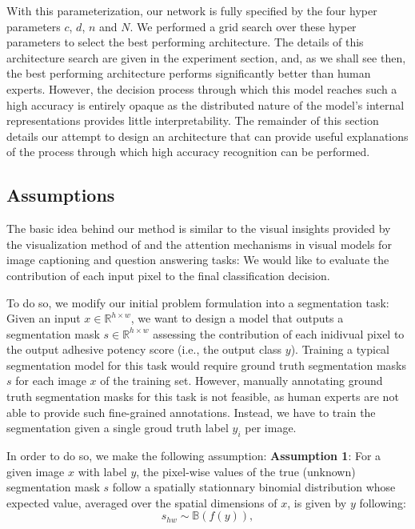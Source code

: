 \documentclass[10pt,twocolumn,letterpaper]{article}
\begin{document}
With this parameterization, our network is fully specified by the four hyper parameters $c$, $d$, $n$ and $N$.
We performed a grid search over these hyper parameters to select the best performing architecture.
The details of this architecture search are given in the experiment section,
and, as we shall see then, the best performing architecture performs significantly better than human experts.
However, the decision process through which this model reaches such a high accuracy is entirely opaque
as the distributed nature of the model's internal representations provides little interpretability.
The remainder of this section details our attempt to design an architecture that can provide 
useful explanations of the process through which high accuracy recognition can be performed.

\subsection{Assumptions}
The basic idea behind our method is similar to the visual insights provided by the
visualization method of \cite{} and the attention mechanisms in visual models 
for image captioning and question answering tasks:
We would like to evaluate the contribution of each input pixel to the final classification decision. 

To do so, we modify our initial problem formulation into a segmentation task:
Given an input $x \in \mathbb{R}^{h \times w}$, we want to design a model that outputs 
a segmentation mask $s \in \mathbb{R}^{h \times w}$ assessing the contribution of each inidivual pixel to the output adhesive potency score (i.e., the output class $y$).
Training a typical segmentation model for this task would require ground truth 
segmentation masks $s$ for each image $x$ of the training set.
However, manually annotating ground truth segmentation masks for this task is not feasible, 
as human experts are not able to provide such fine-grained annotations.
Instead, we have to train the segmentation given a single groud truth label $y_i$ per image.

In order to do so, we make the following assumption:
\textbf{Assumption 1}: 
For a given image $x$ with label $y$, 
the pixel-wise values of the true (unknown) segmentation mask $s$
follow a spatially stationnary binomial distribution whose expected value, 
averaged over the spatial dimensions of $x$, is given by $y$ following:
$$
s_{hw} \sim \mathbb{B}(f(y)),
$$
\end{document}
